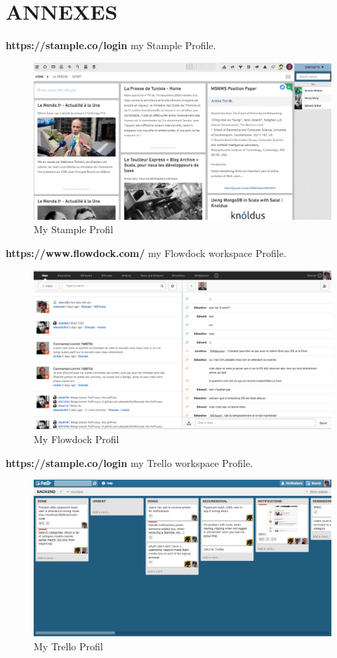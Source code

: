 \chapter{ANNEXES}

\textbf{https://stample.co/login} my Stample Profile.
\begin{figure}[H]
        \centering
                \centering
                \includegraphics[width=\textwidth]{Stample.png}
		\caption{My Stample Profil}

               
\end{figure}
\newpage
\textbf{https://www.flowdock.com/} my Flowdock workspace Profile.
\begin{figure}[H]
        \centering
                \centering
                \includegraphics[width=\textwidth]{Flowdock.png}
               \caption{My Flowdock Profil}

\end{figure}
\textbf{https://stample.co/login} my Trello workspace Profile.
\begin{figure}[H]
        \centering
                \centering
                \includegraphics[width=\textwidth]{trello.png}
               	\caption{My Trello Profil}

\end{figure}
